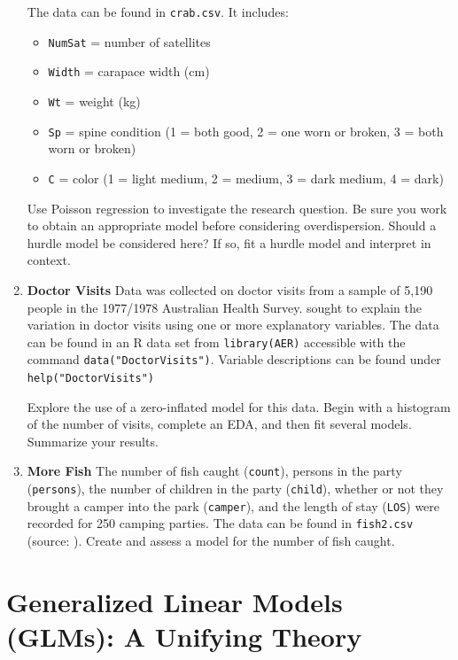 \documentclass[
]{krantz}
\providecommand{\tightlist}{%
  \setlength{\itemsep}{0pt}\setlength{\parskip}{0pt}}
\begin{document}
\begin{enumerate}
  The data can be found in \texttt{crab.csv}. It includes:

  \begin{itemize}
  \tightlist
  \item
    \texttt{NumSat} = number of satellites
  \item
    \texttt{Width} = carapace width (cm)
  \item
    \texttt{Wt} = weight (kg)
  \item
    \texttt{Sp} = spine condition (1 = both good, 2 = one worn or broken, 3 = both worn or broken)
  \item
    \texttt{C} = color (1 = light medium, 2 = medium, 3 = dark medium, 4 = dark)
  \end{itemize}

  Use Poisson regression to investigate the research question. Be sure you work to obtain an appropriate model before considering overdispersion. Should a hurdle model be considered here? If so, fit a hurdle model and interpret in context.
\item
  \textbf{Doctor Visits} Data was collected on doctor visits from a sample of 5,190 people in the 1977/1978 Australian Health Survey. \citet{Cameron1986} sought to explain the variation in doctor visits using one or more explanatory variables. The data can be found in an R data set from \texttt{library(AER)} accessible with the command \texttt{data("DoctorVisits")}. Variable descriptions can be found under \texttt{help("DoctorVisits")}

  Explore the use of a zero-inflated model for this data. Begin with a histogram of the number of visits, complete an EDA, and then fit several models. Summarize your results.
\item
  \textbf{More Fish} The number of fish caught (\texttt{count}), persons in the party (\texttt{persons}), the number of children in the party (\texttt{child}), whether or not they brought a camper into the park (\texttt{camper}), and the length of stay (\texttt{LOS}) were recorded for 250 camping parties. The data can be found in \texttt{fish2.csv} (source: \citet{idre2018}). Create and assess a model for the number of fish caught.
\end{enumerate}

\hypertarget{ch-glms}{%
\chapter{Generalized Linear Models (GLMs): A Unifying Theory}\label{ch-glms}}
\end{document}
